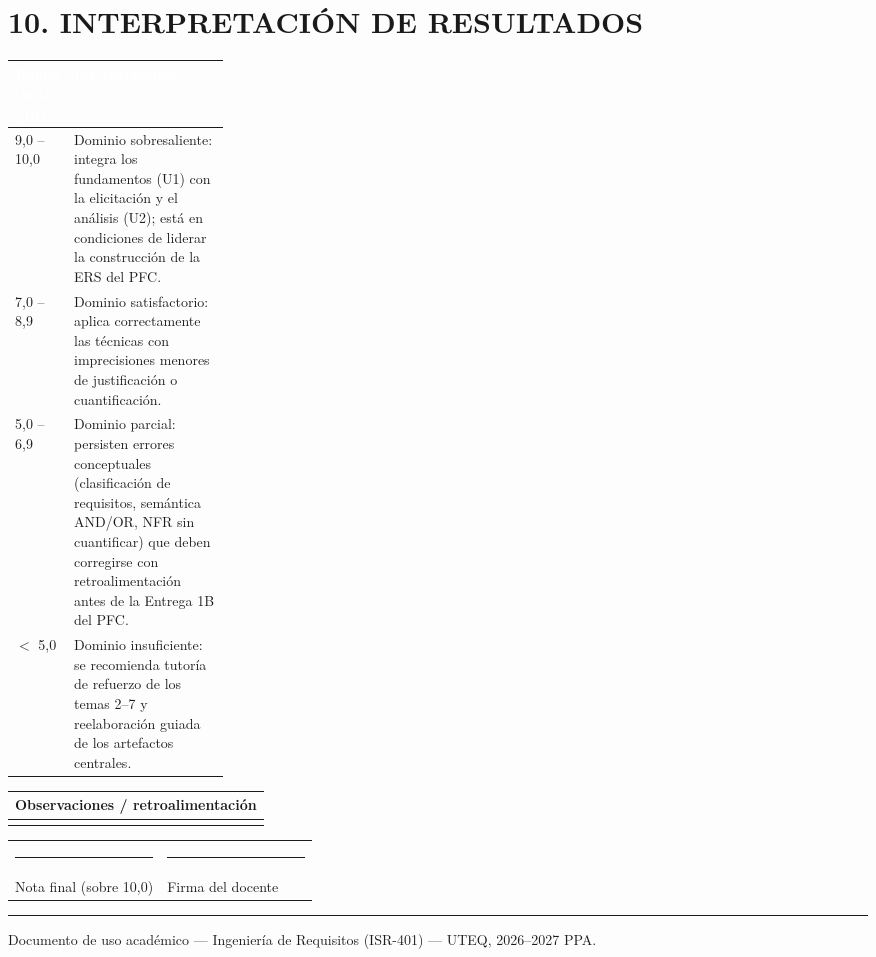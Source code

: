 \documentclass[11pt]{article}
\newcommand{\thdr}[1]{\cellcolor{utegreen}\textcolor{white}{\textbf{#1}}}
\begin{document}
\section*{\textcolor{utegreendk}{10. INTERPRETACIÓN DE RESULTADOS}}

\noindent\begin{tabularx}{\linewidth}{|C{0.25\linewidth}|X|}
\hline
\thdr{Banda (nota /10)} & \thdr{Interpretación}\\
\hline
{}9{,}0 -- 10{,}0 & Dominio sobresaliente: integra los fundamentos (U1) con la elicitación y el análisis (U2); está en condiciones de liderar la construcción de la ERS del PFC.\\
\hline
{}7{,}0 -- 8{,}9 & Dominio satisfactorio: aplica correctamente las técnicas con imprecisiones menores de justificación o cuantificación.\\
\hline
{}5{,}0 -- 6{,}9 & Dominio parcial: persisten errores conceptuales (clasificación de requisitos, semántica AND/OR, NFR sin cuantificar) que deben corregirse con retroalimentación antes de la Entrega 1B del PFC.\\
\hline
{}$<$ 5{,}0 & Dominio insuficiente: se recomienda tutoría de refuerzo de los temas 2--7 y reelaboración guiada de los artefactos centrales.\\
\hline
\end{tabularx}

\vspace{14pt}
\noindent\begin{tabularx}{\linewidth}{|X|}
\hline
\cellcolor{lightblue}\textbf{Observaciones / retroalimentación} \\
\hline
\rule{0pt}{42pt} \\
\hline
\end{tabularx}

\vspace{18pt}
\noindent\begin{tabularx}{\linewidth}{C{0.5\linewidth}C{0.5\linewidth}}
\rule{6cm}{0.4pt} & \rule{6cm}{0.4pt} \\
Nota final (sobre 10{,}0) & Firma del docente \\
\end{tabularx}

\vspace{10pt}
\noindent\textcolor{gold}{\rule{\linewidth}{1.5pt}}
\begin{center}
\footnotesize Documento de uso académico --- Ingeniería de Requisitos (ISR-401) --- UTEQ, 2026--2027 PPA.
\end{center}
\end{document}
